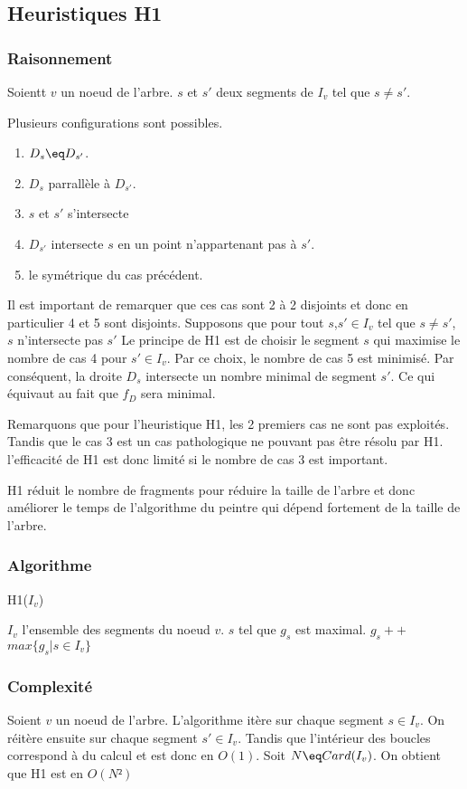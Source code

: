 \subsection{Heuristiques H1}
\subsubsection{Raisonnement}
Soientt $v$ un noeud de l'arbre. $s$ et $s'$ deux segments de $I_v$ tel que $s \ne s'$.

Plusieurs configurations sont possibles.
\begin{enumerate}
\item  $D_s \eq D_{s'} $.
\item $D_s$ parrallèle à $D_{s'} $.
\item $s$ et $s'$ s'intersecte
\item $D_{s'}$ intersecte $s$ en un point n'appartenant pas à $s'$.
\item le symétrique du cas précédent.
\end{enumerate}

Il est important de remarquer que ces cas sont 2 à 2 disjoints et donc en particulier 4 et 5 sont disjoints.
Supposons que pour tout $s$,$s' \in I_v $ tel que $s \neq s'$, $s$ n'intersecte pas $s'$
Le principe de H1 est de choisir le segment $s$ qui maximise le nombre de cas 4 pour $s' \in I_v$.
Par ce choix, le nombre de cas 5 est minimisé.
Par conséquent, la droite $D_s$ intersecte un nombre minimal de segment $s'$.
Ce qui équivaut au fait que $f_D$ sera minimal.


Remarquons que pour l'heuristique H1, les 2 premiers cas ne sont pas exploités.
Tandis que le cas 3 est un cas pathologique ne pouvant pas être résolu par H1.
l'efficacité de H1 est donc limité si le nombre de cas 3 est important.

H1 réduit le nombre de fragments pour réduire la taille de l'arbre et donc améliorer le temps de l'algorithme du peintre qui dépend fortement de la taille de l'arbre.

\subsubsection{Algorithme}
\begin{algorithm}
  \caption{H1($I_v$)}
  \begin{algorithmic}[1] \label{algo:propvis}
    \REQUIRE $I_v$ l'ensemble des segments du noeud $v$.
    \ENSURE $s$ tel que $g_s$ est maximal.
    \state $g_s++$
    \ENDIF
    \ENDFOR
    \ENDFOR
    \RETURN $max\{g_s|s\in I_v\}$
  \end{algorithmic}
\end{algorithm}
\subsubsection{Complexité}
Soient $v$ un noeud de l'arbre. L'algorithme itère sur chaque segment $s \in I_v$.
On réitère ensuite sur chaque segment $s' \in I_v$. Tandis que l'intérieur des boucles correspond à du calcul et est donc en $O(1)$.
Soit $N \eq Card(I_v)$. On obtient que H1 est en $O(N²)$
